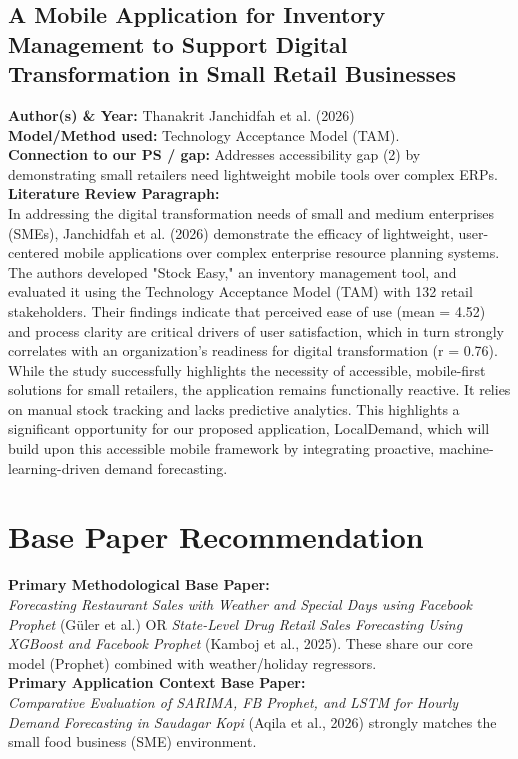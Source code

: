 \documentclass[conference]{IEEEtran}
\begin{document}
\subsection{A Mobile Application for Inventory Management to Support Digital Transformation in Small Retail Businesses}
\textbf{Author(s) \& Year:} Thanakrit Janchidfah et al. (2026)\\
\textbf{Model/Method used:} Technology Acceptance Model (TAM).\\
\textbf{Connection to our PS / gap:} Addresses accessibility gap (2) by demonstrating small retailers need lightweight mobile tools over complex ERPs.\\
\textbf{Literature Review Paragraph:}\\
In addressing the digital transformation needs of small and medium enterprises (SMEs), Janchidfah et al. (2026) demonstrate the efficacy of lightweight, user-centered mobile applications over complex enterprise resource planning systems. The authors developed "Stock Easy," an inventory management tool, and evaluated it using the Technology Acceptance Model (TAM) with 132 retail stakeholders. Their findings indicate that perceived ease of use (mean = 4.52) and process clarity are critical drivers of user satisfaction, which in turn strongly correlates with an organization's readiness for digital transformation (r = 0.76). While the study successfully highlights the necessity of accessible, mobile-first solutions for small retailers, the application remains functionally reactive. It relies on manual stock tracking and lacks predictive analytics. This highlights a significant opportunity for our proposed application, LocalDemand, which will build upon this accessible mobile framework by integrating proactive, machine-learning-driven demand forecasting.

\section{Base Paper Recommendation}

\textbf{Primary Methodological Base Paper:}\\
\textit{Forecasting Restaurant Sales with Weather and Special Days using Facebook Prophet} (Güler et al.) OR \textit{State-Level Drug Retail Sales Forecasting Using XGBoost and Facebook Prophet} (Kamboj et al., 2025). These share our core model (Prophet) combined with weather/holiday regressors.\\

\textbf{Primary Application Context Base Paper:}\\
\textit{Comparative Evaluation of SARIMA, FB Prophet, and LSTM for Hourly Demand Forecasting in Saudagar Kopi} (Aqila et al., 2026) strongly matches the small food business (SME) environment.
\end{document}
